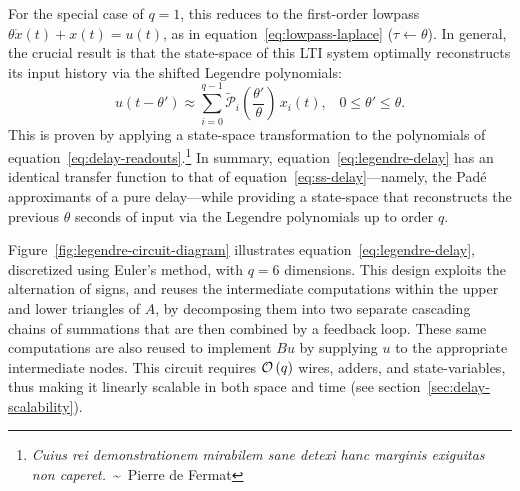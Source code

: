 For the special case of $q = 1$, this reduces to the first-order lowpass $\theta \dot{x}(t) + x(t) = u(t)$, as in equation~\ref{eq:lowpass-laplace} ($\tau \leftarrow \theta$).
In general, the crucial result is that the state-space of this LTI system optimally reconstructs its input history via the shifted Legendre polynomials:
\begin{equation} 
\boxed{ u(t - \theta') \approx \sum_{i=0}^{q-1} \tilde{\mathcal{P}}_{i} \left(\frac{\theta'}{\theta} \right) \, x_{i}(t) \text{,} \quad 0 \le \theta' \le \theta \text{.} }
\end{equation}
This is proven by applying a state-space transformation to the polynomials of equation~\ref{eq:delay-readouts}.\footnote{%
\emph{Cuius rei demonstrationem mirabilem sane detexi hanc marginis exiguitas non caperet.}~\textasciitilde~Pierre de Fermat}
In summary, equation~\ref{eq:legendre-delay} has an identical transfer function to that of equation~\ref{eq:ss-delay}---namely, the Pad\'e approximants of a pure delay---while providing a state-space that reconstructs the previous $\theta$ seconds of input via the Legendre polynomials up to order $q$.


Figure~\ref{fig:legendre-circuit-diagram} illustrates equation~\ref{eq:legendre-delay}, discretized using Euler's method, with $q = 6$ dimensions.
This design exploits the alternation of signs, and reuses the intermediate computations within the upper and lower triangles of $A$, by decomposing them into two separate cascading chains of summations that are then combined by a feedback loop.
These same computations are also reused to implement $Bu$ by supplying $u$ to the appropriate intermediate nodes.
This circuit requires $\mathcal{O}\left({q}\right)$ wires, adders, and state-variables, thus making it linearly scalable in both space and time (see section~\ref{sec:delay-scalability}).

